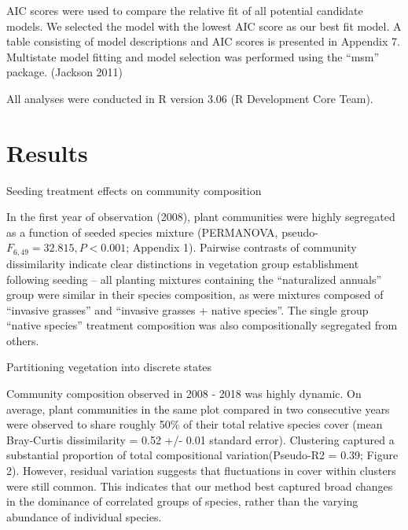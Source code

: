 \documentclass[twoside,12pt,final]{ucthesis-CA2012}
\begin{document}
\begin{ucmainmatter}
AIC scores were used to compare the relative fit of all potential candidate models. We selected the model with the lowest AIC score as our best fit model.
A table consisting of model descriptions and AIC scores is presented in Appendix 7. Multistate model fitting and model selection was performed using the ``msm'' package. (Jackson 2011)

All analyses were conducted in R version 3.06 (R Development Core Team).

\hypertarget{results}{%
\section{Results}\label{results}}

Seeding treatment effects on community composition

In the first year of observation (2008), plant communities were highly segregated as a function of seeded species mixture (PERMANOVA, pseudo-\(F_{6, 49} = 32.815, P < 0.001\); Appendix 1).
Pairwise contrasts of community dissimilarity indicate clear distinctions in vegetation group establishment following seeding -- all planting mixtures containing the ``naturalized annuals'' group were similar in their species composition, as were mixtures composed of ``invasive grasses'' and ``invasive grasses + native species''.
The single group ``native species'' treatment composition was also compositionally segregated from others.

Partitioning vegetation into discrete states

Community composition observed in 2008 - 2018 was highly dynamic.
On average, plant communities in the same plot compared in two consecutive years were observed to share roughly 50\% of their total relative species cover (mean Bray-Curtis dissimilarity = 0.52 +/- 0.01 standard error).
Clustering captured a substantial proportion of total compositional variation(Pseudo-R2 = 0.39; Figure 2).
However, residual variation suggests that fluctuations in cover within clusters were still common.
This indicates that our method best captured broad changes in the dominance of correlated groups of species, rather than the varying abundance of individual species.


\end{ucmainmatter}
\end{document}
